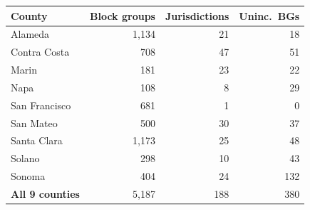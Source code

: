 \begin{tabular}{lrrr}
\toprule
County & Block groups & Jurisdictions & Uninc.\ BGs \\
\midrule
Alameda & 1,134 & 21 & 18 \\
Contra Costa & 708 & 47 & 51 \\
Marin & 181 & 23 & 22 \\
Napa & 108 & 8 & 29 \\
San Francisco & 681 & 1 & 0 \\
San Mateo & 500 & 30 & 37 \\
Santa Clara & 1,173 & 25 & 48 \\
Solano & 298 & 10 & 43 \\
Sonoma & 404 & 24 & 132 \\
\midrule
\textbf{All 9 counties} & 5,187 & 188 & 380 \\
\bottomrule
\end{tabular}
